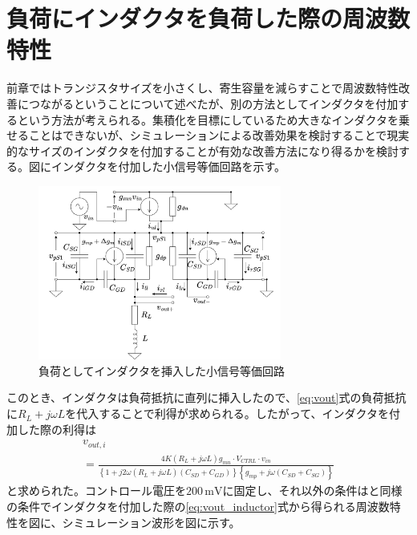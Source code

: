 \documentclass[twocolumn]{jsarticle}
\begin{document}
\section{負荷にインダクタを負荷した際の周波数特性}
    前章ではトランジスタサイズを小さくし、寄生容量を減らすことで周波数特性改善につながるということについて述べたが、別の方法としてインダクタを付加するという方法が考えられる。集積化を目標にしているため大きなインダクタを乗せることはできないが、シミュレーションによる改善効果を検討することで現実的なサイズのインダクタを付加することが有効な改善方法になり得るかを検討する。図にインダクタを付加した小信号等価回路を示す。
    \begin{figure}[H]
        \begin{center}
            \includegraphics*[width = 80mm]{figures/ParasiticInductorHalfEquivalent.png}
            \caption{負荷としてインダクタを挿入した小信号等価回路}
            \label{fig:inductor}
        \end{center}
    \end{figure}
    このとき、インダクタは負荷抵抗に直列に挿入したので、\eqref{eq:vout}式の負荷抵抗に$R_{L}+j\omega L$を代入することで利得が求められる。したがって、インダクタを付加した際の利得は
    \begin{multline}
        v_{out,i} \\
        = \frac{4K(R_{L}+j\omega L)g_{mn}\cdot V_{CTRL}\cdot v_{in}}{ \left\{ 1+j2\omega(R_{L}+j\omega L)(C_{SD}+C_{GD}) \right\}\left\{ g_{mp}+j\omega(C_{SD}+C_{SG}) \right\} }    \label{eq:vout_inductor}
    \end{multline}
    と求められた。コントロール電圧を$200\,\mathrm{mV}$に固定し、それ以外の条件はと同様の条件でインダクタを付加した際の\eqref{eq:vout_inductor}式から得られる周波数特性を図に、シミュレーション波形を図に示す。
\end{document}

